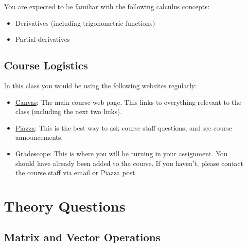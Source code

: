\documentclass{16384_doc}
\begin{document}
You are expected to be familiar with the following calculus concepts:

\begin{itemize}
    \item Derivatives (including trigonometric functions)
    \item Partial derivatives
\end{itemize}

\subsection{Course Logistics}

In this class you would be using the following websites regularly:

\begin{itemize}
    \item \href{https://canvas.cmu.edu/courses/42018}{Canvas}: The main course web page. This links to everything relevant to the class (including the next two links).
    \item \href{https://canvas.cmu.edu/courses/42018/external_tools/11046}{Piazza}: This is the best way to ask course staff questions, and see course announcements.
    \item \href{https://canvas.cmu.edu/courses/42018/external_tools/11047?display=borderless}{Gradescope}: This is where you will be turning in your assignment. You should have already been added to the course. If you haven't, please contact the course staff via email or Piazza post.
\end{itemize}

\writtenSection
    \newpage
    
\section{Theory Questions}



    \subsection{Matrix and Vector Operations}
\end{document}
